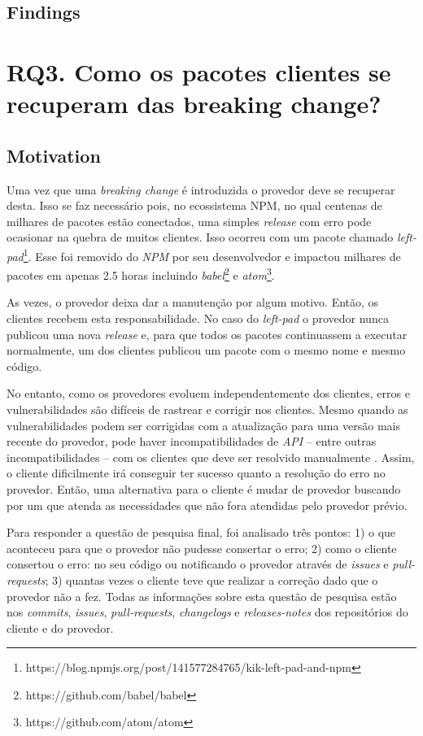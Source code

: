 \subsection{Findings}
\label{fin:rq2}

\section{RQ3. Como os pacotes clientes se recuperam das breaking change?}
\label{sec:rq3}

\subsection{Motivation}
\label{mot:rq3}

Uma vez que uma \textit{breaking change} é introduzida o provedor deve se recuperar desta. Isso se faz necessário pois, no ecossistema \gls{NPM}, no qual centenas de milhares de pacotes estão conectados, uma simples \textit{release} com erro pode ocasionar na quebra de muitos clientes. Isso ocorreu com um pacote chamado \textit{left-pad}\footnote{https://blog.npmjs.org/post/141577284765/kik-left-pad-and-npm}. Esse foi removido do \textit{NPM} por seu desenvolvedor e impactou milhares de pacotes em apenas 2.5 horas incluindo \textit{babel}\footnote{https://github.com/babel/babel} e \textit{atom}\footnote{https://github.com/atom/atom}.

As vezes, o provedor deixa dar a manutenção por algum motivo. Então, os clientes recebem esta responsabilidade. No caso do \textit{left-pad} o provedor nunca publicou uma nova \textit{release} e, para que todos os pacotes continuassem a executar normalmente, um dos clientes publicou um pacote com o mesmo nome e mesmo código.

No entanto, como os provedores evoluem independentemente dos clientes, erros e vulnerabilidades são difíceis de rastrear e corrigir nos clientes. Mesmo quando as vulnerabilidades podem ser corrigidas com a atualização para uma versão mais recente do provedor, pode haver incompatibilidades de \textit{API} -- entre outras incompatibilidades -- com os clientes que deve ser resolvido manualmente \cite{Foo:2018:ESC:3236024.3275535}. Assim, o cliente dificilmente irá conseguir ter sucesso quanto a resolução do erro no provedor. Então, uma alternativa para o cliente é mudar de provedor buscando por um que atenda as necessidades que não fora atendidas pelo provedor prévio.

Para responder a questão de pesquisa final, foi analisado três pontos: 1) o que aconteceu para que o provedor não pudesse consertar o erro; 2) como o cliente consertou o erro: no seu código ou notificando o provedor através de \textit{issues} e \textit{pull-requests}; 3) quantas vezes o cliente teve que realizar a correção dado que o provedor não a fez. Todas as informações sobre esta questão de pesquisa estão nos \textit{commits}, \textit{issues}, \textit{pull-requests}, \textit{changelogs} e \textit{releases-notes} dos repositórios do cliente e do provedor.

